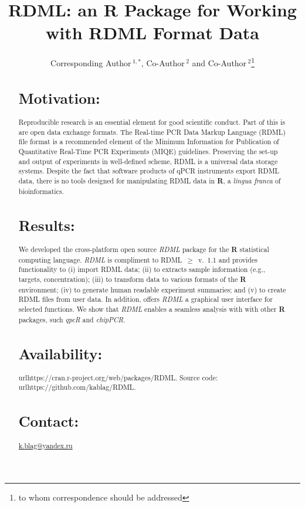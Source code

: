\documentclass{bioinfo}
\begin{document}
	
\title[RDML]{RDML: an \textbf{R} Package for Working with RDML Format Data}
\author[Sample \textit{et~al}]{Corresponding Author\,$^{1,*}$, Co-Author\,$^{2}$ 
	and Co-Author\,$^2$\footnote{to whom correspondence should be addressed}}

\address{$^{1}$Department of XXXXXXX, Address XXXX etc.\\ $^{2}$Department of XXXXXXXX, Address XXXX etc.}
	

	
\maketitle

\begin{abstract}
		
\section{Motivation:} Reproducible research is an essential 
element for good scientific conduct. Part of this is are open data exchange 
formats. The  Real-time PCR Data Markup Language (RDML) file format is a 
recommended element of the Minimum Information for Publication of Quantitative 
Real-Time PCR Experiments (MIQE) guidelines. Preserving the set-up and output of 
experiments in well-defined scheme, RDML is a universal data storage systems. 
Despite the fact that software products of qPCR instruments export RDML data, 
there is no tools designed for manipulating RDML data in \textbf{R}, a 
\textit{lingua franca} of bioinformatics.
		
\section{Results:} We developed the cross-platform open source \textit{RDML} 
package for the  \textbf{R} statistical computing language. \textit{RDML} is 
compliment to RDML~$\geq$~v.~1.1 and provides functionality to (i) import RDML 
data; (ii) to extracts sample information (e.g., targets, concentration); (iii) 
to transform data to various formats of the \textbf{R} environment; (iv) to 
generate human readable experiment summaries; and (v) to create RDML files from 
user data. In addition, offers \textit{RDML} a graphical user interface for 
selected functions. We show that \textit{RDML} enables a seamless analysis with 
with other \textbf{R} packages, such \textit{qpcR} and \textit{chipPCR}.

\section{Availability:} url{https://cran.r-project.org/web/packages/RDML}. Source code: 
url{https://github.com/kablag/RDML}. \section{Contact:} 
\href{k.blag@yandex.ru}{k.blag@yandex.ru} \end{abstract}
\end{document}
